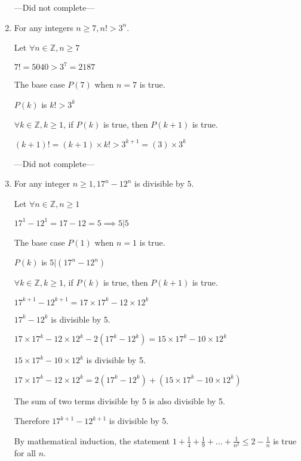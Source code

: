 \documentclass[12pt,letterpaper,titlepage]{article}
\begin{document}
\begin{raggedright}
\begin{enumerate}[label=(\alph*)]
---Did not complete---

\pagebreak
\item
For any integers $n \geq 7, n!>3^n$.

Let $\forall n \in \mathbb{Z}, n \geq 7$

$7! = 5040 > 3^7 = 2187$

The base case $P(7)$ when $n = 7$ is true.

$P(k)$ is $k!>3^k$

$\forall k \in \mathbb{Z}, k \geq 1$, if $P(k)$ is true, then $P(k+1)$ is true.

$(k+1)! = (k+1)\times k! > 3^{k+1} = (3)\times 3^k$

---Did not complete---

\item
For any integer $n \geq 1, 17^n-12^n$ is divisible by $5$.

Let $\forall n \in \mathbb{Z}, n \geq 1$

$17^1-12^1 = 17-12=5\implies 5|5$

The base case $P(1)$ when $n = 1$ is true.

$P(k)$ is $5 | (17^n-12^n)$

$\forall k \in \mathbb{Z}, k \geq 1$, if $P(k)$ is true, then $P(k+1)$ is true.

$17^{k+1}-12^{k+1} = 17\times17^k-12\times12^k$

$17^k-12^k$ is divisible by 5.

$17\times17^k-12\times12^k - 2(17^k-12^k) = 15\times17^k-10\times12^k$

$15\times17^k-10\times12^k$ is divisible by 5.

$17\times17^k-12\times12^k = 2(17^k-12^k) + (15\times17^k-10\times12^k)$

The sum of two terms divisible by 5 is also divisible by 5.

Therefore $17^{k+1}-12^{k+1}$ is divisible by 5.

By mathematical induction, the statement $1+\frac{1}{4}+\frac{1}{9}+\ldots+\frac{1}{n^2}\leq 2 - \frac{1}{n}$ is true for all $n$.

\end{enumerate}
\end{raggedright}
\end{document}
